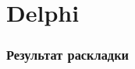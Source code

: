 \documentclass{beamer}
\begin{document}

\section{Delphi}
\begin{frame}
\frametitle{Результат раскладки}
\begin{figure}[htbp]
	\begin{minipage}[b]{0.49\linewidth}
	\end{minipage}
\hfill
\begin{minipage}[b]{0.49\linewidth}

\end{minipage}
\end{figure}
\end{frame}
\end{document}

